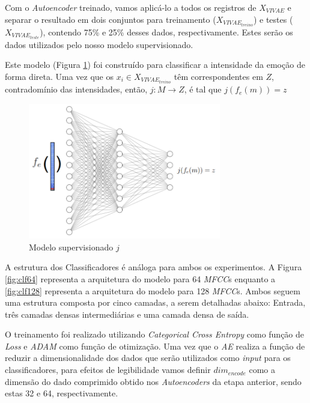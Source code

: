 Com o \textit{Autoencoder} treinado, vamos aplicá-lo a todos os registros de $X_{VIVAE}$ e separar o resultado em dois conjuntos para treinamento ($X_{VIVAE_{treino}}$) e testes ($X_{VIVAE_{teste}}$), contendo 75\% e 25\% desses dados, respectivamente. Estes serão os dados utilizados pelo nosso modelo supervisionado.


Este modelo (Figura \ref{fig:jsupervisionado}) foi construído para classificar a intensidade da emoção de forma direta. Uma vez que os $x_i \in X_{VIVAE_{treino}}$ têm correspondentes em $Z$, contradomínio das intensidades, então, $j: M \rightarrow Z$, é tal que $j(f_e(m)) = z$

\begin{figure}[h]
    \centering
    \includegraphics[width=0.75\textwidth]{img/p-supervisionado.png}
    \caption{\label{fig:jsupervisionado}Modelo supervisionado $j$}
\end{figure}


A estrutura dos Classificadores é análoga para ambos os experimentos. A Figura \ref{fig:clf64} representa a arquitetura do modelo para 64 \textit{MFCC}s enquanto a \ref{fig:clf128} representa a arquitetura do modelo para 128 \textit{MFCC}s. Ambos seguem uma estrutura composta por cinco camadas, a serem detalhadas abaixo: Entrada, três camadas densas intermediárias e uma camada densa de saída.

O treinamento foi realizado utilizando \textit{Categorical Cross Entropy} como função de \textit{Loss} e \textit{ADAM} como função de otimização. Uma vez que o \textit{AE} realiza a função de reduzir a dimensionalidade dos dados que serão utilizados como \textit{input} para os classificadores, para efeitos de legibilidade vamos definir $dim_{encode}$ como a dimensão do dado comprimido obtido nos \textit{Autoencoders} da etapa anterior, sendo estas 32 e 64, respectivamente.


